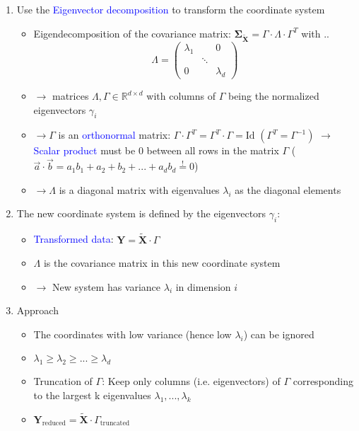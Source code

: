 \documentclass[a4paper,10pt,twoside=true,DIV=10,headsepline,plainheadsepline]{scrartcl}
\begin{document}
\begin{enumerate}
			\item Use the \textcolor{blue}{Eigenvector decomposition} to transform the coordinate system
			\begin{itemize}
				\item Eigendecomposition of the covariance matrix: $ \mathbf{\Sigma}_{\mathbf{\tilde{X}}} = \Gamma \cdot \Lambda \cdot \Gamma^T$ with .. 
				\begin{equation} 
					\Lambda = \begin{pmatrix}
  						\lambda_1 & & 0\\
  						& \ddots & \\
  						0 & & \lambda_d
 						\end{pmatrix}
				\end{equation}
				\item $\rightarrow$ matrices $\Lambda, \Gamma \in \mathbb{R}^{d \times d}$ with columns of $\Gamma$ being the normalized eigenvectors $\gamma_i$
				\item $\rightarrow \Gamma$ is an \textcolor{blue}{orthonormal} matrix: $\Gamma \cdot \Gamma^T = \Gamma^T \cdot \Gamma = \textrm{Id } (\Gamma^T = \Gamma^{-1})$ $\rightarrow$ \textcolor{blue}{Scalar product} must be 0 between all rows in the matrix $\Gamma$ ($\vec{a} \cdot \vec{b} = a_1 b_1 + a_2 + b_2 + ... + a_d b_d \stackrel{!}{=} 0$)
				\item $\rightarrow \Lambda$ is a diagonal matrix with eigenvalues $\lambda_i$ as the diagonal elements
			\end{itemize}

			\item The new coordinate system is defined by the eigenvectors $\gamma_i$:
			\begin{itemize}
				\item \textcolor{blue}{Transformed data}: $\mathbf{Y} = \mathbf{\tilde{X}} ⋅ \Gamma$
				\item $\Lambda$ is the covariance matrix in this new coordinate system
				\item $\rightarrow$ New system has variance $\lambda_i$ in dimension $i$
			\end{itemize}

			\item Approach
			\begin{itemize}
				\item The coordinates with low variance (hence low $\lambda_i$) can be ignored
				\item $\lambda_1 \geq \lambda_2 \geq ... \geq \lambda_d$
				\item Truncation of $\Gamma$: Keep only columns (i.e. eigenvectors) of $\Gamma$ corresponding to the largest k eigenvalues $\lambda_1, ... , \lambda_k$
				\item $\mathbf{Y}_{\textrm{reduced}} = \mathbf{\tilde{X}} ⋅ \Gamma_{\textrm{truncated}}$
			\end{itemize}
		\end{enumerate}
\end{document}
